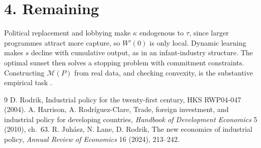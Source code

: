 \documentclass[11pt]{article}
\theoremstyle{definition}
\begin{document}
\section*{4. Remaining}
Political replacement and lobbying make $\kappa$ endogenous to $\tau$, since larger programmes attract more capture, so
$W'(0)$ is only local. Dynamic learning makes $s$ decline with cumulative output, as in an infant-industry structure. The
optimal sunset then solves a stopping problem with commitment constraints. Constructing $\mathcal M(P)$ from real data,
and checking convexity, is the substantive empirical task \cite{rodrik,hrc,jlr}.

\begin{thebibliography}{9}
 D. Rodrik, Industrial policy for the twenty-first century, HKS RWP04-047 (2004).
 A. Harrison, A. Rodr\'iguez-Clare, Trade, foreign investment, and industrial policy for developing countries, \emph{Handbook of Development Economics} 5 (2010), ch.~63.
 R. Juh\'asz, N. Lane, D. Rodrik, The new economics of industrial policy, \emph{Annual Review of Economics} 16 (2024), 213--242.
\end{thebibliography}
\end{document}

